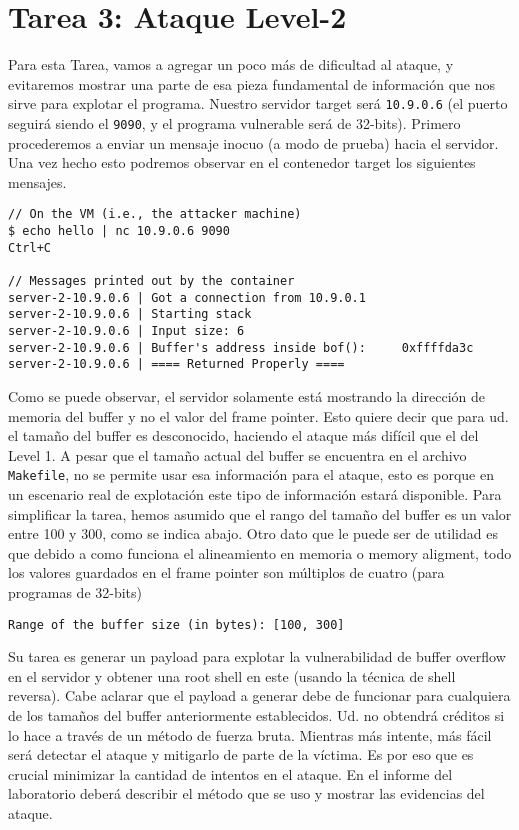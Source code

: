 \section{Tarea 3: Ataque Level-2} 

Para esta Tarea, vamos a agregar un poco más de dificultad al ataque, y evitaremos mostrar una parte de esa pieza fundamental de información que nos sirve para explotar el programa. Nuestro servidor target será \texttt{10.9.0.6} (el puerto seguirá siendo el \texttt{9090}, y el programa vulnerable será de 32-bits). 
Primero procederemos a enviar un mensaje inocuo (a modo de prueba) hacia el servidor.
Una vez hecho esto podremos observar en el contenedor target los siguientes mensajes.

\begin{lstlisting}
// On the VM (i.e., the attacker machine)
$ echo hello | nc 10.9.0.6 9090
Ctrl+C

// Messages printed out by the container
server-2-10.9.0.6 | Got a connection from 10.9.0.1
server-2-10.9.0.6 | Starting stack
server-2-10.9.0.6 | Input size: 6
server-2-10.9.0.6 | Buffer's address inside bof():     0xffffda3c
server-2-10.9.0.6 | ==== Returned Properly ====
\end{lstlisting}

Como se puede observar, el servidor solamente está mostrando la dirección de memoria del buffer y no el valor del frame pointer. Esto quiere decir que para ud. el tamaño del buffer es desconocido, haciendo el ataque más difícil que el del Level 1.
A pesar que el tamaño actual del buffer se encuentra en el archivo \texttt{Makefile}, no se permite usar esa información para el ataque, esto es porque en un escenario real de explotación este tipo de información estará disponible.
Para simplificar la tarea, hemos asumido que el rango del tamaño del buffer es un valor entre 100 y 300, como se indica abajo.
Otro dato que le puede ser de utilidad es que debido a como funciona el alineamiento en memoria o memory aligment, todo los valores guardados en el frame pointer son múltiplos de cuatro (para programas de 32-bits)


\begin{lstlisting}
Range of the buffer size (in bytes): [100, 300]
\end{lstlisting}
 
Su tarea es generar un payload para explotar la vulnerabilidad de buffer overflow en el servidor y obtener una root shell en este (usando la técnica de shell reversa). Cabe aclarar que el payload a generar debe de funcionar para cualquiera de los tamaños del buffer anteriormente establecidos. Ud. no obtendrá créditos si lo hace a través de un método de fuerza bruta. Mientras más intente, más fácil será detectar el ataque y mitigarlo de parte de la víctima. Es por eso que es crucial minimizar la cantidad de intentos en el ataque.
En el informe del laboratorio deberá describir el método que se uso y mostrar las evidencias del ataque.


